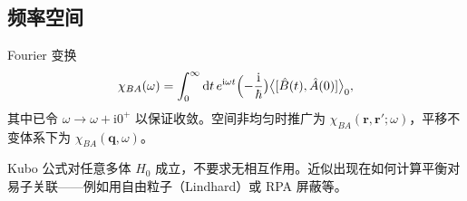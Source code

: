 \subsection{频率空间}

Fourier 变换
\begin{equation}
  \chi_{BA}(\omega)
  =\int_0^{\infty}\mathrm{d}t\,
  e^{\mathrm{i}\omega t}
  \Bigl(
  -\frac{\mathrm{i}}{\hbar}
  \bigr)
  \bigl\langle[\hat B(t),\hat A(0)]\bigr\rangle_0,
\end{equation}
其中已令 $\omega\to\omega+\mathrm{i}0^+$ 以保证收敛。空间非均匀时推广为 $\chi_{BA}(\mathbf{r},\mathbf{r}';\omega)$，平移不变体系下为 $\chi_{BA}(\mathbf{q},\omega)$。

\begin{note}
Kubo 公式对任意多体 $H_0$ 成立，不要求无相互作用。近似出现在如何计算平衡对易子关联——例如用自由粒子（Lindhard）或 RPA 屏蔽等。
\end{note}
